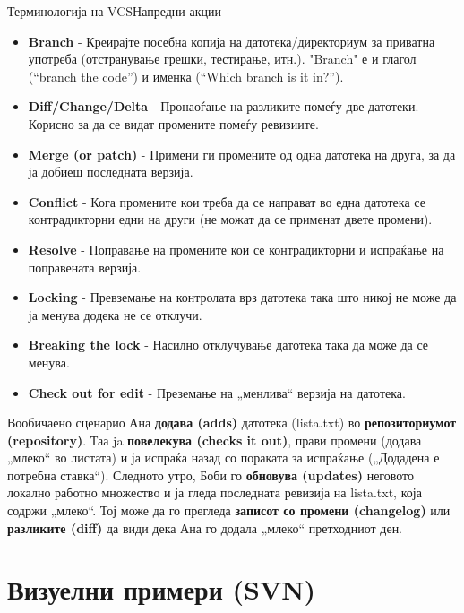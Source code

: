 \begin{frame}{Терминологија на VCS}{Напредни акции}
\begin{scriptsize}
\begin{itemize}
    \item \textbf{Branch} - Креирајте посебна копија на датотека/директориум за
    приватна употреба (отстранување грешки, тестирање, итн.). "Branch" е и глагол
        (“branch the code”) и именка (“Which branch is it in?”).
    \item \textbf{Diff/Change/Delta} - Пронаоѓање на разликите помеѓу две
    датотеки. Корисно за да се видат промените помеѓу ревизиите.
    \item \textbf{Merge (or patch)} - Примени ги промените од одна датотека
    на друга, за да ја добиеш последната верзија.
    \item \textbf{Conflict} - Кога промените кои треба да се направат во една
    датотека се контрадикторни едни на други (не можат да се применат двете
    промени).
    \item \textbf{Resolve} - Поправање на промените кои се контрадикторни и
    испраќање на поправената верзија.
    \item \textbf{Locking} - Превземање на контролата врз датотека така што
    никој не може да ја менува додека не се отклучи.
    \item \textbf{Breaking the lock} - Насилно отклучување датотека така да може
    да се менува.
    \item \textbf{Check out for edit} - Преземање на „менлива“ верзија на
    датотека.
\end{itemize}
\end{scriptsize}
\end{frame}

\begin{frame}{Вообичаено сценарио}
Ана \textbf{додава (adds)} датотека (lista.txt) во \textbf{репозиториумот (repository)}. 
Таа ja \textbf{повелекува (checks it out)}, прави промени (додава „млеко“ во
листата) и ја испраќа назад со пораката за испраќање („Додадена е потребна
ставка“). Следното утро, Боби го \textbf{обновува (updates)} неговото локално работно множество и
ја гледа последната ревизија на lista.txt, која содржи „млеко“. Тој може да го
прегледа \textbf{записот со промени (changelog)} или \textbf{разликите (diff)}
да види дека Ана го додала „млеко“ претходниот ден.
\end{frame}

\section{Визуелни примери (SVN)}

